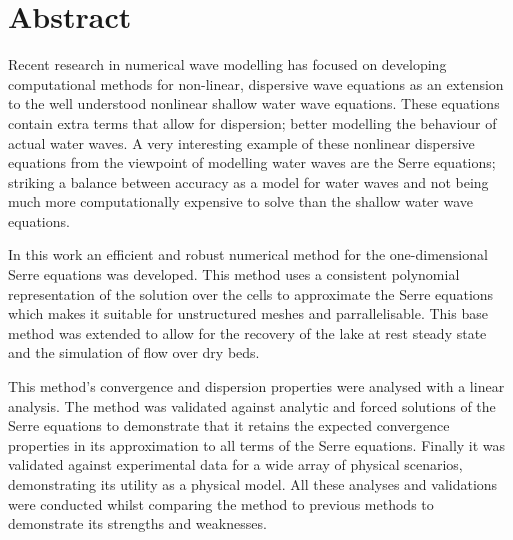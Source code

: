 \chapter*{Abstract}\label{abstract}


Recent research in numerical wave modelling has focused on developing computational methods for non-linear, dispersive wave equations as an extension to the well understood nonlinear shallow water wave equations. These equations contain extra terms that allow for dispersion; better modelling the behaviour of actual water waves. A very interesting example of these nonlinear dispersive equations from the viewpoint of modelling water waves are the Serre equations; striking a balance between accuracy as a model for water waves and not being much more computationally expensive to solve than the shallow water wave equations. 

In this work an efficient and robust numerical method for the one-dimensional Serre equations was developed. This method uses a consistent polynomial representation of the solution over the cells to approximate the Serre equations which makes it suitable for unstructured meshes and parrallelisable. This base method was extended to allow for the recovery of the lake at rest steady state and the simulation of flow over dry beds.  

This method's convergence and dispersion properties were analysed with a linear analysis. The method was validated against analytic and forced solutions of the Serre equations to demonstrate that it retains the expected convergence properties in its approximation to all terms of the Serre equations. Finally it was validated against experimental data for a wide array of physical scenarios, demonstrating its utility as a physical model. All these analyses and validations were conducted whilst comparing the method to previous methods to demonstrate its strengths and weaknesses. 


